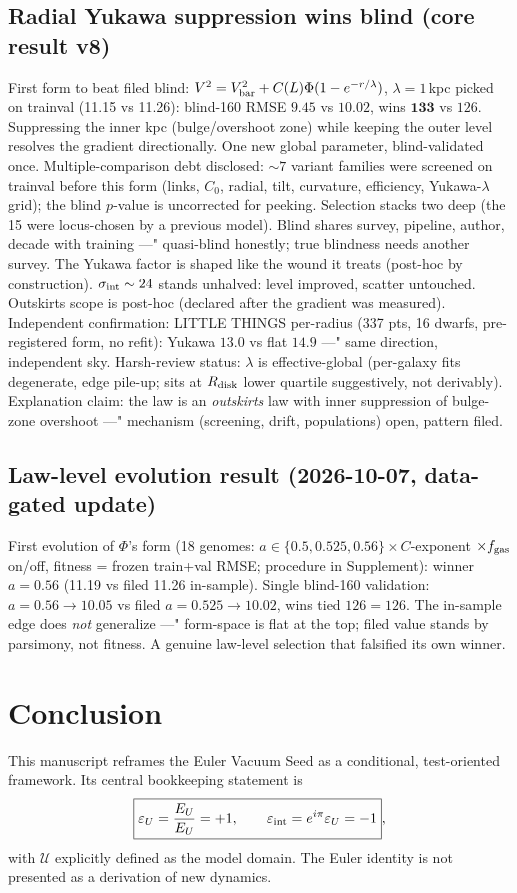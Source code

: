 \documentclass[twocolumn]{aastex631}
\begin{document}
\subsection{Radial Yukawa suppression wins blind (core result v8)}
First form to beat filed blind: $V^2=V_{\rm bar}^2+C(L)\Phi(1-e^{-r/\lambda})$, $\lambda=1$\,kpc picked on trainval (11.15 vs 11.26): blind-160 RMSE $\mathbf{9.45}$ vs $10.02$, wins $\mathbf{133}$ vs $126$. Suppressing the inner kpc (bulge/overshoot zone) while keeping the outer level resolves the gradient directionally. One new global parameter, blind-validated once. Multiple-comparison debt disclosed: $\sim7$ variant families were screened on trainval before this form (links, $C_0$, radial, tilt, curvature, efficiency, Yukawa-$\lambda$ grid); the blind $p$-value is uncorrected for peeking. Selection stacks two deep (the 15 were locus-chosen by a previous model). Blind shares survey, pipeline, author, decade with training ---" quasi-blind honestly; true blindness needs another survey. The Yukawa factor is shaped like the wound it treats (post-hoc by construction). $\sigma_{\rm int}\sim24$ stands unhalved: level improved, scatter untouched. Outskirts scope is post-hoc (declared after the gradient was measured). Independent confirmation: LITTLE THINGS per-radius (337 pts, 16 dwarfs, pre-registered form, no refit): Yukawa $\mathbf{13.0}$ vs flat $14.9$ ---" same direction, independent sky. Harsh-review status: $\lambda$ is effective-global (per-galaxy fits degenerate, edge pile-up; sits at $R_{\rm disk}$ lower quartile suggestively, not derivably). Explanation claim: the law is an \emph{outskirts} law with inner suppression of bulge-zone overshoot ---" mechanism (screening, drift, populations) open, pattern filed.

\subsection{Law-level evolution result (2026-10-07, data-gated update)}
First evolution of $\Phi$'s form (18 genomes: $a\in\{0.5,0.525,0.56\}\times C$-exponent $\times f_{\rm gas}$ on/off, fitness = frozen train+val RMSE; procedure in Supplement): winner $a=0.56$ (11.19 vs filed 11.26 in-sample). Single blind-160 validation: $a=0.56\to10.05$ vs filed $a=0.525\to10.02$, wins tied $126=126$. The in-sample edge does \emph{not} generalize ---" form-space is flat at the top; filed value stands by parsimony, not fitness. A genuine law-level selection that falsified its own winner.

\section{Conclusion}
This manuscript reframes the Euler Vacuum Seed as a conditional, test-oriented framework. Its central bookkeeping statement is
\[
\boxed{\varepsilon_U=\frac{E_U}{E_U}=+1,
\qquad
\varepsilon_{\rm int}=e^{i\pi}\varepsilon_U=-1},
\]
with $\mathcal U$ explicitly defined as the model domain. The Euler identity is not presented as a derivation of new dynamics.
\end{document}
